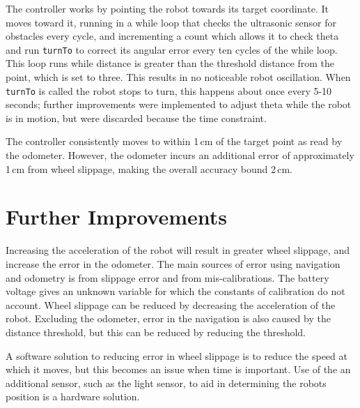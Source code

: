 \documentclass[twocolumn]{article}
\begin{document}
The controller works by pointing the robot towards its target coordinate. It moves toward it, running in a while loop that checks the ultrasonic sensor for obstacles every cycle, and incrementing a count which allows it to check theta and run {\tt turnTo} to correct its angular error every ten cycles of the while loop. This loop runs while distance is greater than the threshold distance from the point, which is set to three. This results in no noticeable robot oscillation. When {\tt turnTo} is called the robot stops to turn, this happens about once every 5-10 seconds; further improvements were implemented to adjust theta while the robot is in motion, but were discarded because the time constraint.

The controller consistently moves to within 1\,cm of the target point as read by the odometer. However, the odometer incurs an additional error of approximately 1\,cm from wheel slippage, making the overall accuracy bound 2\,cm.

\section{Further Improvements}

Increasing the acceleration of the robot will result in greater wheel slippage, and increase the error in the odometer. The main sources of error using navigation and odometry is from slippage error and from mis-calibrations. The battery voltage gives an unknown variable for which the constants of calibration do not account. Wheel slippage can be reduced by decreasing the acceleration of the robot. Excluding the odometer, error in the navigation is also caused by the distance threshold, but this can be reduced by reducing the threshold.

A software solution to reducing error in wheel slippage is to reduce the speed at which it moves, but this becomes an issue when time is important. Use of the an additional sensor, such as the light sensor, to aid in determining the robots position is a hardware solution.


\end{document}

